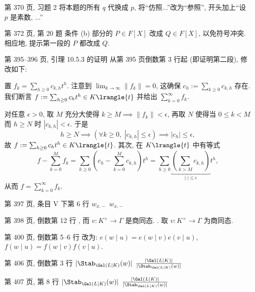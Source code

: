\documentclass{AJerrata}
\begin{document}
\begin{Errata}
        \item[第 370 页, 习题 2]
		将本题的所有 $q$ 代换成 $p$, 将``仿照...''改为``参照'', 开头加上``设 $p$ 是素数, ...''
        
   		\item[第 372 页, 第 20 题]
        条件 (b) 部分的 $P \in F[X]$ 改成 $Q \in F[X]$, 以免符号冲突. 相应地, 提示第一段的 $P$ 都改成 $Q$.
        
        \item[第 395--396 页, 引理 10.5.3 的证明]
        从第 395 页倒数第 3 行起 (即证明第二段), 修改如下:

		置 $f_k = \sum_{h \geq 0} c_{k,h} t^h$. 注意到 $\lim_{k \to \infty} \|f_k\| = 0$, 这确保 $c_h := \sum_{k \geq 0} c_{k,h}$ 存在. 我们断言 $f := \sum_{h \geq 0} c_h t^h \in K\lrangle{t}$ 并给出 $\sum_{k=0}^\infty f_k$.
        
        对任意 $\epsilon > 0$, 取 $M$ 充分大使得 $k \geq M \implies \|f_k\| < \epsilon$, 再取 $N$ 使得当 $0 \leq k < M$ 而 $h \geq N$ 时 $|c_{k,h}| < \epsilon$. 于是
        \[ h \geq N \implies \left( \forall k \geq 0, \; |c_{k,h}| \leq \epsilon \right) \implies |c_h| \leq \epsilon, \]
        故 $f := \sum_{h \geq 0} c_h t^h \in K\lrangle{t}$. 其次, 在 $K\lrangle{t}$ 中有等式
        \[ f - \sum_{k=0}^M f_k = \sum_{h \geq 0} \left( c_h - \sum_{k=0}^M c_{k,h} \right) t^h = \sum_{h \geq 0} \underbracket{ \left( \sum_{k > M} c_{k,h} \right)}_{|\cdot| \leq \epsilon} t^h , \]
        从而 $f = \sum_{k=0}^\infty f_k$.
        

        \item[第 397 页, 条目 V 下第 6 行]
        \Orig $w_{x.-}$
        \Corr $w_{x,-}$

        \item[第 398 页, 倒数第 12 行]
        \Orig \; , 而 $v: K^\times \to \Gamma$ 是商同态.
        \Corr \; . 取 $v: K^\times \to \Gamma$ 为商同态.
        
        \item[第 400 页, 倒数第 5--6 行]
		改为: $e(w \mid u) = e(w \mid v) e(v \mid u)$, $f(w \mid u) = f(w \mid v) f(v \mid u)$.

		\item[第 406 页, 倒数第 3 行]
		\Orig $|\Stab_{\Gal(L|K)}(w)|$
		\Corr $\frac{|\Gal(L|K)|}{|\Stab_{\Gal(L|K)}(w)|}$
		
		\item[第 407 页, 第 8 行]
		\Orig $|\Stab_{\Gal(L|K)}(w)|$
		\Corr $\frac{|\Gal(L|K)|}{|\Stab_{\Gal(L|K)}(w)|}$


\end{Errata}
\end{document}
